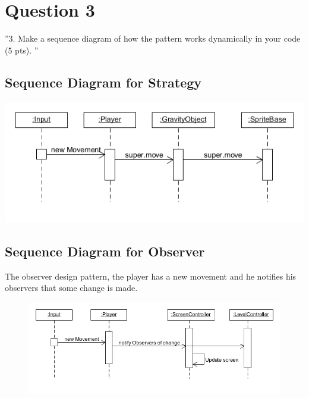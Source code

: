 \section{Question 3}

''3. Make a sequence diagram of how the pattern works dynamically in your code (5 pts). ''
\\
\subsection{Sequence Diagram for Strategy}
\includegraphics[width=\textwidth]{sequenceDiagramStrategy}

\subsection{Sequence Diagram for Observer}
The observer design pattern, the player has a new movement and he notifies his observers that some change is made.
\begin{figure}[h]
\includegraphics[width=\textwidth]{sequenceDiagramObserver}
\end{figure}

